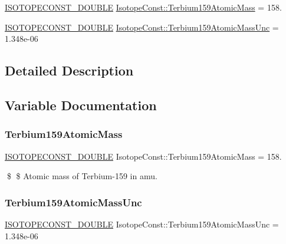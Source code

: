 \begin{DoxyCompactItemize}
\item 
\mbox{\hyperlink{group___isotope_const-_macros_ga8f45a7272ce02c0b4c65c44636ed719a}{I\+S\+O\+T\+O\+P\+E\+C\+O\+N\+S\+T\+\_\+\+D\+O\+U\+B\+LE}} \mbox{\hyperlink{group___isotope_const-_terbium-_tb159_ga7aee396dfac49b21404805cae99611bf}{Isotope\+Const\+::\+Terbium159\+Atomic\+Mass}} = 158.
\item 
\mbox{\hyperlink{group___isotope_const-_macros_ga8f45a7272ce02c0b4c65c44636ed719a}{I\+S\+O\+T\+O\+P\+E\+C\+O\+N\+S\+T\+\_\+\+D\+O\+U\+B\+LE}} \mbox{\hyperlink{group___isotope_const-_terbium-_tb159_ga9b2e49b6b3aabfd6568533b37ae67ef1}{Isotope\+Const\+::\+Terbium159\+Atomic\+Mass\+Unc}} = 1.\+348e-\/06
\end{DoxyCompactItemize}


\subsection{Detailed Description}


\subsection{Variable Documentation}
\mbox{\label{group___isotope_const-_terbium-_tb159_ga7aee396dfac49b21404805cae99611bf}} 
\subsubsection{\texorpdfstring{Terbium159\+Atomic\+Mass}{Terbium159AtomicMass}}
{\footnotesize\ttfamily \mbox{\hyperlink{group___isotope_const-_macros_ga8f45a7272ce02c0b4c65c44636ed719a}{I\+S\+O\+T\+O\+P\+E\+C\+O\+N\+S\+T\+\_\+\+D\+O\+U\+B\+LE}} Isotope\+Const\+::\+Terbium159\+Atomic\+Mass = 158.}

\$ \$ Atomic mass of Terbium-\/159 in amu. \mbox{\label{group___isotope_const-_terbium-_tb159_ga9b2e49b6b3aabfd6568533b37ae67ef1}} 
\subsubsection{\texorpdfstring{Terbium159\+Atomic\+Mass\+Unc}{Terbium159AtomicMassUnc}}
{\footnotesize\ttfamily \mbox{\hyperlink{group___isotope_const-_macros_ga8f45a7272ce02c0b4c65c44636ed719a}{I\+S\+O\+T\+O\+P\+E\+C\+O\+N\+S\+T\+\_\+\+D\+O\+U\+B\+LE}} Isotope\+Const\+::\+Terbium159\+Atomic\+Mass\+Unc = 1.\+348e-\/06}

